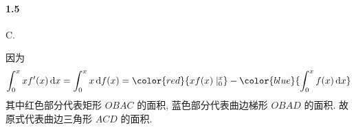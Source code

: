 \paragraph*{1.5}C. 

因为
\[
	\int_{0}^{x} xf'(x)\,\mathrm{d}x=\int_{0}^{x}x\,\mathrm{d}f(x)=\color{red}{xf(x)\mid_{0}^{x}}-\color{blue}{\int_{0}^{x}f(x)\,\mathrm{d}x}
\]
其中红色部分代表矩形 $OBAC$ 的面积, 蓝色部分代表曲边梯形 $OBAD$ 的面积. 故原式代表曲边三角形 $ACD$ 的面积.